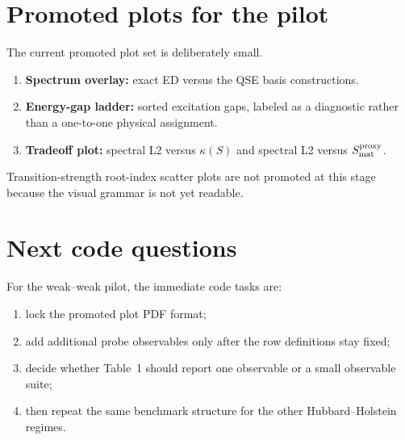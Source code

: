 \documentclass[10pt,twocolumn]{article}
\begin{document}
\section{Promoted plots for the pilot}
The current promoted plot set is deliberately small.
\begin{enumerate}
\item \textbf{Spectrum overlay:} exact ED versus the QSE basis constructions.
\item \textbf{Energy-gap ladder:} sorted excitation gaps, labeled as a diagnostic rather than a one-to-one physical assignment.
\item \textbf{Tradeoff plot:} spectral L2 versus \(\kappa(S)\) and spectral L2 versus \(S_{\rm mat}^{\rm proxy}\).
\end{enumerate}
Transition-strength root-index scatter plots are not promoted at this stage because the visual grammar is not yet readable.

\section{Next code questions}
For the weak--weak pilot, the immediate code tasks are:
\begin{enumerate}
\item lock the promoted plot PDF format;
\item add additional probe observables only after the row definitions stay fixed;
\item decide whether Table~1 should report one observable or a small observable suite;
\item then repeat the same benchmark structure for the other Hubbard--Holstein regimes.
\end{enumerate}
\end{document}
